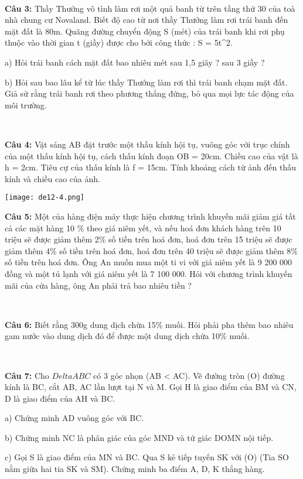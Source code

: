 \documentclass[12pt]{article}
\begin{document}
\    

\textbf{Câu 3:} Thầy Thưởng vô tình làm rơi một quả banh từ trên tầng thứ 30 của toà nhà chung cư Novaland. Biết độ cao từ nơi thầy Thưởng làm rơi trái banh đến mặt đất là 80m. Quãng đường chuyển động S (mét) của trái banh khi rơi phụ thuộc vào thời gian t (giầy) được cho bởi công thức  : S = 5t^2. \par
a) Hỏi trái banh cách mặt đất bao nhiêu mét sau 1,5 giây ? sau 3 giầy ? \par
b) Hỏi sau bao lâu kể từ lúc thầy Thưởng làm rơi thì trái banh chạm mặt đất. Giả sử rằng trái banh rơi theo phương thẳng đứng, bỏ qua mọi lực tác động của môi trường. \par

\    

\textbf{Câu 4:} Vặt sáng AB đặt trước một thấu kính hội tụ, vuông góc với trục chính của một thấu kính hội tụ, cách thấu kính đoạn OB = 20cm. Chiều cao của vật là h = 2cm. Tiêu cự của thấu kính là f = 15cm. Tính khoảng cách từ ảnh đến thấu kính và chiều cao của ảnh. 

\begin{center}
    \texttt{[image: de12-4.png]}
\end{center}

\textbf{Câu 5:} Một của hàng điện máy thực hiện chương trình khuyến mãi giảm giá tất cả các mặt hàng 10 \% theo giá niêm yết, và nếu hoá đơn khách hàng trên 10 triệu sẽ được giảm thêm 2\% số tiền trên hoá đơn, hoá đơn trên 15 triệu sẽ được giảm thêm 4\% số tiền trên hoá đơn, hoá đơn trên 40 triệu sẽ được giảm thêm 8\% số tiền trên hoá đơn. Ông An muốn mua một ti vi  với giá niêm yết là 9 200 000 đồng và một tủ lạnh với giá niêm yết là 7 100 000. Hỏi với chương trình khuyến mãi của cửa hàng, ông An phải trả bao nhiêu tiền ?

\   

\textbf{Câu 6:} Biết rằng 300g dung dịch chừa 15\% muối. Hỏi phải pha thêm bao nhiêu gam nước vào dung dịch đó để được một dung dịch chứa 10\% muối.

\    

\textbf{Câu 7:} Cho $Delta ABC$ có 3 góc nhọn (AB < AC). Vẽ đường tròn (O) đường kính là BC, cắt AB, AC lần lượt tại N và M. Gọi H là giao điểm của BM và CN, D là giao điểm của AH và BC. \par
a) Chứng minh AD vuông góc với BC. \par
b) Chứng minh NC là phân giác của góc MND và tứ giác DOMN nội tiếp. \par
c) Gọi S là giao điểm của MN và BC. Qua S kẻ tiếp tuyến SK với (O) (Tia SO nằm giữa hai tia SK và SM). Chứng minh ba điểm A, D, K thẳng hàng.
\end{document}
